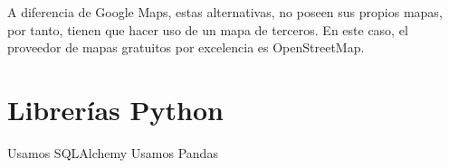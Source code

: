    A diferencia de Google Maps, estas alternativas, no poseen sus propios mapas, por tanto, tienen que hacer uso de un mapa de terceros. En este caso, el proveedor de mapas gratuitos por excelencia es OpenStreetMap\cite{osm}.
  
  \section{Librerías Python}
    Usamos SQLAlchemy
    Usamos Pandas
    